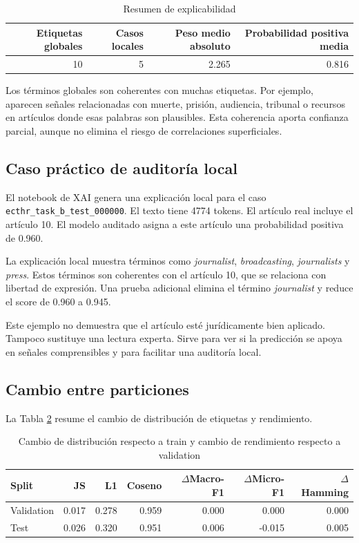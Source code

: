\documentclass[11pt,a4paper]{article}
\begin{document}
\begin{table}[H]
\centering
\caption{Resumen de explicabilidad}
\label{tab_xai}
\small
\begin{tabular}{@{}rrrr@{}}
\toprule
\textbf{Etiquetas globales} & \textbf{Casos locales} & \textbf{Peso medio absoluto} & \textbf{Probabilidad positiva media}\\
\midrule
10 & 5 & 2.265 & 0.816\\
\bottomrule
\end{tabular}
\end{table}

Los términos globales son coherentes con muchas etiquetas. Por ejemplo, aparecen señales relacionadas con muerte, prisión, audiencia, tribunal o recursos en artículos donde esas palabras son plausibles. Esta coherencia aporta confianza parcial, aunque no elimina el riesgo de correlaciones superficiales.

\subsection{Caso práctico de auditoría local}

El notebook de XAI genera una explicación local para el caso \texttt{ecthr\_task\_b\_test\_000000}. El texto tiene 4774 tokens. El artículo real incluye el artículo 10. El modelo auditado asigna a este artículo una probabilidad positiva de 0.960.

La explicación local muestra términos como \textit{journalist}, \textit{broadcasting}, \textit{journalists} y \textit{press}. Estos términos son coherentes con el artículo 10, que se relaciona con libertad de expresión. Una prueba adicional elimina el término \textit{journalist} y reduce el score de 0.960 a 0.945.

Este ejemplo no demuestra que el artículo esté jurídicamente bien aplicado. Tampoco sustituye una lectura experta. Sirve para ver si la predicción se apoya en señales comprensibles y para facilitar una auditoría local.

\subsection{Cambio entre particiones}

La Tabla \ref{tab_drift} resume el cambio de distribución de etiquetas y rendimiento.

\begin{table}[H]
\centering
\caption{Cambio de distribución respecto a train y cambio de rendimiento respecto a validation}
\label{tab_drift}
\small
\begin{tabular}{@{}lrrrrrr@{}}
\toprule
\textbf{Split} & \textbf{JS} & \textbf{L1} & \textbf{Coseno} & \(\Delta\)\textbf{Macro-F1} & \(\Delta\)\textbf{Micro-F1} & \(\Delta\)\textbf{Hamming}\\
\midrule
Validation & 0.017 & 0.278 & 0.959 & 0.000 & 0.000 & 0.000\\
Test & 0.026 & 0.320 & 0.951 & 0.006 & -0.015 & 0.005\\
\bottomrule
\end{tabular}
\end{table}
\end{document}
